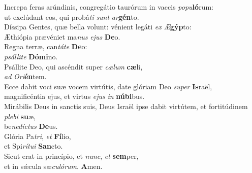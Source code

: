 \oddverse Increpa feras arúndinis, congregátio taurórum in vaccis \textit{po}\textit{pu}\textbf{ló}rum:~\*\\
\oddverse ut exclúdant eos, qui probá\textit{ti} \textit{sunt} \textit{ar}\textbf{gén}to.\\
\evenverse Díssipa Gentes, quæ bella volunt: vénient legáti \textit{ex} \textit{Æ}\textbf{gýp}to:~\*\\
\evenverse Æthiópia prævéniet ma\textit{nus} \textit{e}\textit{jus} \textbf{De}o.\\
\oddverse Regna terræ, can\textit{tá}\textit{te} \textbf{De}o:~\*\\
\oddverse \textit{psál}\textit{li}\textit{te} \textbf{Dó}\textbf{mi}no.\\
\evenverse Psállite Deo, qui ascéndit super \textit{cæ}\textit{lum} \textbf{cæ}li,~\*\\
\evenverse \textit{ad} \textit{O}\textit{ri}\textbf{én}tem.\\
\oddverse Ecce dabit voci suæ vocem virtútis, date glóriam Deo \textit{su}\textit{per} \textbf{Is}raël,~\*\\
\oddverse magnificéntia ejus, et virtus \textit{e}\textit{jus} \textit{in} \textbf{nú}\textbf{bi}bus.\\
\evenverse Mirábilis Deus in sanctis suis, Deus Israël ipse dabit virtútem, et fortitúdinem \textit{ple}\textit{bi} \textbf{su}æ,~\*\\
\evenverse be\textit{ne}\textit{dí}\textit{ctus} \textbf{De}us.\\
\oddverse Glória Pa\textit{tri}, \textit{et} \textbf{Fí}lio,~\*\\
\oddverse et Spi\textit{rí}\textit{tu}\textit{i} \textbf{San}cto.\\
\evenverse Sicut erat in princípio, et \textit{nunc}, \textit{et} \textbf{sem}per,~\*\\
\evenverse et in sǽcula sæ\textit{cu}\textit{ló}\textit{rum}. \textbf{A}men.\\

